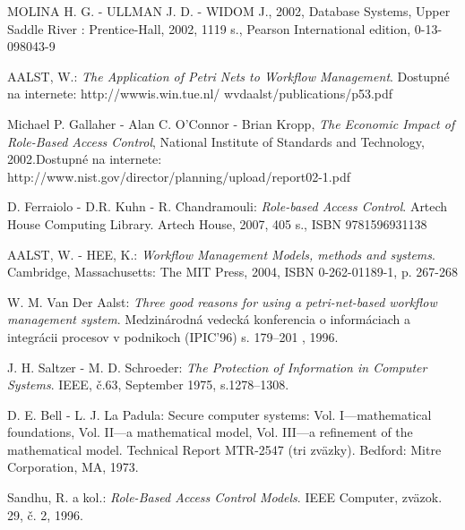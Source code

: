 \documentclass[12pt, oneside]{book}
\begin{document}
%

% 

\begin{thebibliography}{5}
 
 MOLINA H. G. - ULLMAN J. D. - WIDOM J., 2002, Database Systems, Upper Saddle River : Prentice-Hall, 2002, 1119 s., Pearson International edition, 0-13-098043-9

AALST, W.: \textit{The Application of Petri Nets to Workflow Management}. Dostupné
na internete: http://wwwis.win.tue.nl/ wvdaalst/publications/p53.pdf


Michael P. Gallaher - Alan C. O'Connor - Brian Kropp, \textit{ The Economic Impact
of Role-Based Access Control}, National Institute of Standards and Technology,
2002.Dostupné na internete: http://www.nist.gov/director/planning/upload/report02-1.pdf

D. Ferraiolo - D.R. Kuhn - R. Chandramouli: \textit{Role-based Access Control}. Artech
House Computing Library. Artech House, 2007, 405 s., ISBN 9781596931138


AALST, W. - HEE, K.: \textit{Workflow Management Models, methods and systems}. Cambridge,
Massachusetts: The MIT Press, 2004, ISBN 0-262-01189-1, p.
267-268

W. M. Van Der Aalst: \textit{Three good reasons for using a petri-net-based workflow
management system}. Medzinárodná vedecká konferencia o informáciach a integrácii procesov v podnikoch (IPIC’96)
s. 179–201 , 1996.

J. H. Saltzer - M. D. Schroeder: \textit{The Protection of Information in Computer
Systems}.  IEEE, č.63, September 1975, s.1278–1308.

D. E. Bell - L. J. La Padula: Secure computer systems: Vol. I—mathematical
foundations,  Vol. II—a mathematical model,  Vol. III—a refinement of the mathematical
model. Technical Report MTR-2547 (tri zväzky). Bedford: Mitre Corporation, MA, 1973.

Sandhu, R. a kol.: \textit{Role-Based Access Control Models}. IEEE Computer, zväzok.
29, č. 2, 1996.


\end{thebibliography}
\end{document}
